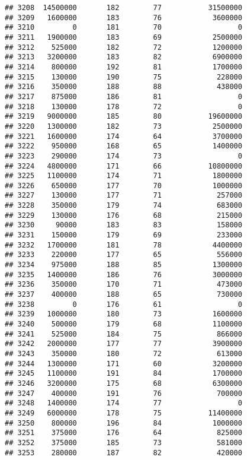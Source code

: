 \documentclass[
]{article}
\begin{document}
\begin{verbatim}
## 3208  14500000       182        77           31500000
## 3209   1600000       183        76            3600000
## 3210         0       181        70                  0
## 3211   1900000       183        69            2500000
## 3212    525000       182        72            1200000
## 3213   3200000       183        82            6900000
## 3214    800000       192        81            1700000
## 3215    130000       190        75             228000
## 3216    350000       188        88             438000
## 3217    875000       186        81                  0
## 3218    130000       178        72                  0
## 3219   9000000       185        80           19600000
## 3220   1300000       182        73            2500000
## 3221   1600000       174        64            3700000
## 3222    950000       168        65            1400000
## 3223    290000       174        73                  0
## 3224   4800000       171        66           10800000
## 3225   1100000       174        71            1800000
## 3226    650000       177        70            1000000
## 3227    130000       177        71             257000
## 3228    350000       179        74             683000
## 3229    130000       176        68             215000
## 3230     90000       183        83             158000
## 3231    150000       179        69             233000
## 3232   1700000       181        78            4400000
## 3233    220000       177        65             556000
## 3234    975000       188        85            1300000
## 3235   1400000       186        76            3000000
## 3236    350000       170        71             473000
## 3237    400000       188        65             730000
## 3238         0       176        61                  0
## 3239   1000000       180        73            1600000
## 3240    500000       179        68            1100000
## 3241    525000       184        75             866000
## 3242   2000000       177        77            3900000
## 3243    350000       180        72             613000
## 3244   1300000       171        60            3200000
## 3245   1100000       191        84            1700000
## 3246   3200000       175        68            6300000
## 3247    400000       191        76             700000
## 3248   1400000       174        77                  0
## 3249   6000000       178        75           11400000
## 3250    800000       196        84            1000000
## 3251    375000       176        64             825000
## 3252    375000       185        73             581000
## 3253    280000       187        82             420000

\end{verbatim}
\end{document}
